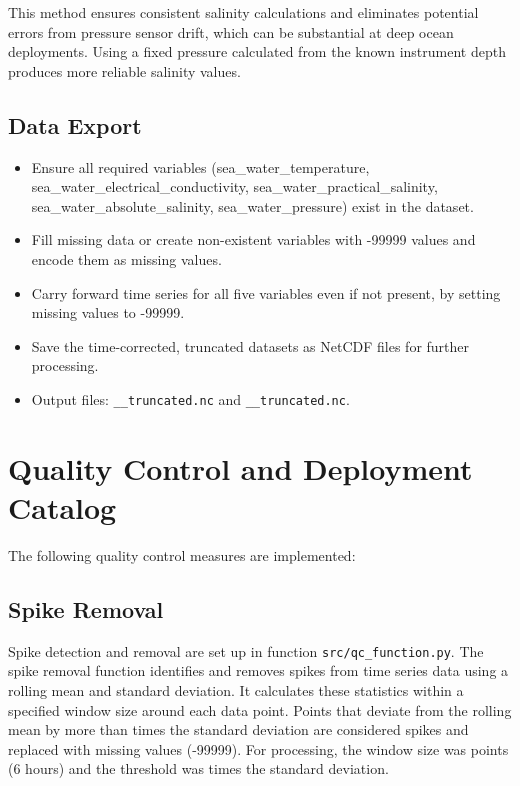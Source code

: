 This method ensures consistent salinity calculations and eliminates potential errors from pressure sensor drift, 
which can be substantial at deep ocean deployments. 
Using a fixed pressure calculated from the known instrument depth produces more reliable salinity values.

\subsection{Data Export}

\begin{itemize}
\item Ensure all required variables (sea\_water\_temperature, sea\_water\_electrical\_conductivity, sea\_water\_practical\_salinity, sea\_water\_absolute\_salinity, sea\_water\_pressure) exist in the dataset.
\item Fill missing data or create non-existent variables with -99999 values and encode them as missing values.
\item Carry forward time series for all five variables even if not present, by setting missing values to -99999.
\item Save the time-corrected, truncated datasets as NetCDF files for further processing.
\item Output files: 
\texttt{\projectname\casenumber\_\FirstInstrument\_truncated.nc}
and \texttt{\projectname\casenumber\_\SecondInstrument\_truncated.nc}.
\end{itemize}


\section{Quality Control and Deployment Catalog}
The following quality control measures are implemented:

\subsection{Spike Removal}
Spike detection and removal are set up in function \texttt{src/qc\_function.py}. 
The spike removal function identifies and removes spikes from time series data using a rolling mean and standard deviation. 
It calculates these statistics within a specified window size around each data point. 
Points that deviate from the rolling mean by more than \ThresholdValue{} times the standard deviation are considered spikes and replaced with missing values (-99999). 
For \projectname{} \casenumber{} processing, the window size was \WindowSize{} points (6 hours) and the threshold was \ThresholdValue{} times the standard deviation.

